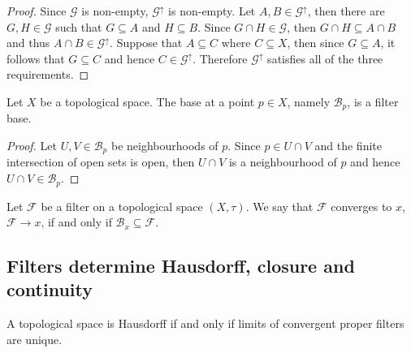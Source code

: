 \begin{proof}
  Since \(\mathcal G\) is non-empty, \(\mathcal G^\uparrow\) is non-empty. Let
  \(A, B \in \mathcal G^\uparrow\), then there are \(G, H \in \mathcal G\) such
  that \(G \subseteq A\) and \(H \subseteq B\). Since \(G \cap H \in \mathcal
  G\), then \(G \cap H \subseteq A \cap B\) and thus \(A \cap B \in \mathcal
  G^\uparrow\). Suppose that \(A \subseteq C\) where \(C \subseteq X\), then
  since \(G \subseteq A\), it follows that \(G \subseteq C\) and hence \(C \in
  \mathcal G^\uparrow\). Therefore \(\mathcal G^\uparrow\) satisfies all of the
  three requirements.
\end{proof}

\begin{proposition}
  Let \(X\) be a topological space. The base at a point \(p \in X\), namely
  \(\mathcal B_p\), is a filter base.
\end{proposition}

\begin{proof}
  Let \(U, V \in \mathcal B_p\) be neighbourhoods of \(p\). Since \(p \in U \cap
  V\) and the finite intersection of open sets is open, then \(U \cap V\) is a
  neighbourhood of \(p\) and hence \(U \cap V \in \mathcal B_p\).
\end{proof}

\begin{definition}
  \label{def: convergence of filters}
  Let \(\mathcal F\) be a filter on a topological space \((X, \tau)\). We
  say that \(\mathcal F\) converges to \(x\), \(\mathcal F \to x\), if and only
  if \(\mathcal B_x \subseteq \mathcal F\).
\end{definition}

\subsection{Filters determine Hausdorff, closure and continuity}

\begin{proposition}[Hausdorff]\label{prop: hausdorff from filter}
  A topological space is Hausdorff if and only if limits of convergent proper
  filters are unique.
\end{proposition}


